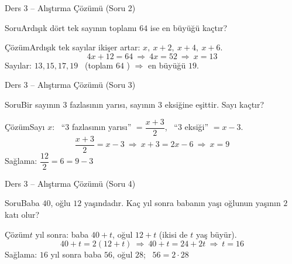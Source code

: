 \documentclass[aspectratio=169,11pt,handout]{beamer}
\newcommand{\soru}[3]{%
\begin{frame}{#1}
  \begin{block}{Soru}\large #2\end{block}
  \pause
  \begin{exampleblock}{Çözüm}\large #3\end{exampleblock}
\end{frame}}
\begin{document}
\soru{Ders 3 -- Alıştırma Çözümü (Soru 2)}
{Ardışık dört tek sayının toplamı \(64\) ise en büyüğü kaçtır?}
{Ardışık tek sayılar ikişer artar: \(x,\ x+2,\ x+4,\ x+6\).
\[4x+12=64\ \Rightarrow\ 4x=52\ \Rightarrow\ x=13\]
Sayılar: \(13,15,17,19\) \ (toplam \(64\) \checkmark) \(\Rightarrow\) en büyüğü \(19\).}

\soru{Ders 3 -- Alıştırma Çözümü (Soru 3)}
{Bir sayının \(3\) fazlasının yarısı, sayının \(3\) eksiğine eşittir. Sayı kaçtır?}
{Sayı \(x\): \ ``\(3\) fazlasının yarısı'' \(=\dfrac{x+3}{2}\), \ ``\(3\) eksiği'' \(=x-3\).
\[\frac{x+3}{2}=x-3\ \Rightarrow\ x+3=2x-6\ \Rightarrow\ x=9\]
Sağlama: \(\dfrac{12}{2}=6=9-3\) \checkmark}

\soru{Ders 3 -- Alıştırma Çözümü (Soru 4)}
{Baba \(40\), oğlu \(12\) yaşındadır. Kaç yıl sonra babanın yaşı oğlunun yaşının \(2\) katı olur?}
{\(t\) yıl sonra: baba \(40+t\), oğul \(12+t\) (ikisi de \(t\) yaş büyür).
\[40+t=2(12+t)\ \Rightarrow\ 40+t=24+2t\ \Rightarrow\ t=16\]
Sağlama: \(16\) yıl sonra baba \(56\), oğul \(28\); \ \(56=2\cdot 28\) \checkmark}
\end{document}
